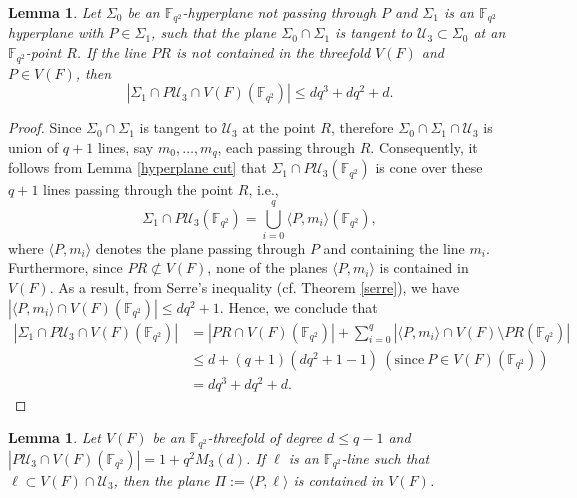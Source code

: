 \documentclass[10pt,a4paper,oneside]{amsproc}
\newtheorem{lemma}[theorem]{Lemma}
\newcommand{\Fqt}{\mathbb{F}_{q^2}}
\newcommand{\U}{\mathcal{U}}
\begin{document}
\begin{lemma}\label{small lem}
 Let $\Sigma_0$ be an $\Fqt$-hyperplane not passing through $P$ and $\Sigma_1$ is an $\Fqt$ hyperplane with $P\in \Sigma_1$, such that the plane $\Sigma_0\cap \Sigma_1$ is tangent to $\U_3\subset \Sigma_0$ at an $\Fqt$-point $R$. If the line $PR$ is not contained in the threefold $V(F)$ and $P\in V(F)$, then $$|\Sigma_1\cap P\U_3\cap V(F)(\Fqt)|\leq dq^3+dq^2+d.$$   
\end{lemma}
\begin{proof}
 Since $\Sigma_0\cap \Sigma_1$ is tangent to $\U_3$ at the point $R$, therefore $\Sigma_0\cap \Sigma_1\cap \U_3$ is union of $q+1$ lines, say $m_0,\dots, m_q$, each passing through $R$. Consequently, it follows from Lemma \ref{hyperplane cut} that $\Sigma_1\cap P\U_3(\Fqt)$ is cone over these $q+1$ lines passing through the point $R$, i.e., $$\Sigma_1\cap P\U_3(\Fqt)=\bigcup_{i=0}^q \langle P, m_i\rangle (\Fqt),$$ where $\langle P, m_i\rangle$ denotes the plane passing through $P$ and containing the line $m_i$. Furthermore, since $PR\not\subset V(F)$, none of the planes $\langle P,m_i \rangle$ is contained in $V(F)$. As a result, from Serre's inequality (cf. Theorem \ref{serre}), we have $|\langle P,m_i \rangle \cap V(F)(\Fqt)|\leq dq^2+1$. 
 Hence, we conclude that 
 \begin{align*}
 |\Sigma_1\cap P\U_3\cap V(F)(\Fqt)|&= |PR\cap V(F)(\Fqt)|+\sum_{i=0}^q |\langle P,m_i\rangle \cap V(F)\setminus PR(\Fqt)|\\
 &\leq d+(q+1)(dq^2+1-1) \ \left(\text{since}\ P\in V(F)(\Fqt)\right)\\
 &=dq^3+dq^2+d.
 \end{align*}
\end{proof}
\begin{lemma}\label{plane involved}
    Let $V(F)$ be an $\Fqt$-threefold of degree $d\leq q-1$ and $|P\U_3\cap V(F)(\Fqt)|=1+q^2M_3(d)$. If $\ell$ is an $\Fqt$-line such that $\ell\subset V(F)\cap \U_3$, then the plane $\Pi:=\langle P,\ell\rangle$ is contained in $V(F)$.
\end{lemma}
\end{document}

